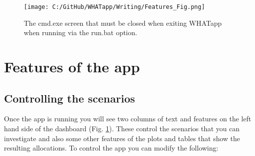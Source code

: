 \documentclass[11pt]{article}
\begin{document}
 \begin{figure} [h]
  \centering
\texttt{[image: C:/GitHub/WHATapp/Writing/Features\_Fig.png]}
  \caption {The cmd.exe screen that must be closed when exiting WHATapp when running via the run.bat option.}
  \label{fig:featpg}
\end{figure}


\section{Features of the app}
\subsection{Controlling the scenarios}
Once the app is running you will see two columns of text and features on the left hand side of the dashboard (Fig. \ref{fig:featpg}). These control the scenarios that you can investigate and also some other features of the plots and tables that show the resulting allocations. To control the app you can modify the following:
\end{document}

